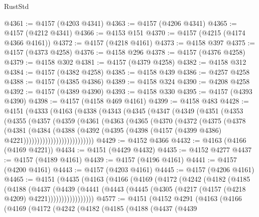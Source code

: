 \begin{lexlean}{RustStd}
\begin{coremodule}
@4361 := @4157 (@4203 @4341)
@4363 := @4157 (@4206 @4341)
@4365 := @4157 (@4212 @4341)
@4366 := @4153 @151
@4370 := @4157 (@4215 (@4174 @4366 @4161))
@4372 := @4157 (@4218 @4161)
@4373 := @4158 @397
@4375 := @4157 (@4373 @4258)
@4376 := @4158 @296
@4378 := @4157 (@4376 @4258)
@4379 := @4158 @302
@4381 := @4157 (@4379 @4258)
@4382 := @4158 @312
@4384 := @4157 (@4382 @4258)
@4385 := @4158 @439
@4386 := @4257 @4258
@4388 := @4157 (@4385 @4386)
@4389 := @4158 @324
@4390 := @4208 @4258
@4392 := @4157 (@4389 @4390)
@4393 := @4158 @330
@4395 := @4157 (@4393 @4390)
@4398 := @4157 (@4158 @469 @4161)
@4399 := @4158 @483
@4428 := @4151
    (@4333
      (@4163
        (@4338
          (@4343
            (@4345
              (@4347
                (@4349
                  (@4351
                    (@4353
                      (@4355
                        (@4357
                          (@4359
                            (@4361
                              (@4363
                                (@4365
                                  (@4370
                                    (@4372
                                      (@4375
                                        (@4378
                                          (@4381
                                            (@4384
                                              (@4388
                                                (@4392
                                                  (@4395
                                                    (@4398
                                                      (@4157
                                                        (@4399 @4386)
                                                        @4221))))))))))))))))))))))))))
@4429 := @4152 @4366
@4432 := @4163 (@4166 (@4169 @4221))
@4434 := @4151 (@4429 @4432)
@4435 := @4152 @4277
@4437 := @4157 (@4189 @4161)
@4439 := @4157 (@4196 @4161)
@4441 := @4157 (@4200 @4161)
@4443 := @4157 (@4203 @4161)
@4445 := @4157 (@4206 @4161)
@4465 := @4151
    (@4435
      (@4163
        (@4166
          (@4169
            (@4172
              (@4242
                (@4182
                  (@4185
                    (@4188
                      (@4437
                        (@4439
                          (@4441
                            (@4443 (@4445 (@4305 (@4217 (@4157 (@4218 @4209) @4221)))))))))))))))))
@4577 := @4151
    (@4152
      @4291
      (@4163
        (@4166
          (@4169
            (@4172
              (@4242
                (@4182
                  (@4185
                    (@4188
                      (@4437
                        (@4439

\end{coremodule}
\end{lexlean}
